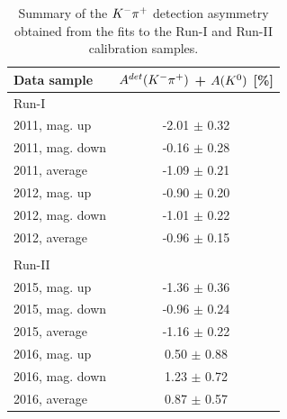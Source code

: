 \begin{table}[h]
\centering
 \begin{tabular}{l c}
 \hline
 \hline
Data sample & $A^{det}({{K}^-}{{\pi}^+})$ + $A({{K}^0})$ [\%] \\
\hline
Run-I & \\ 
2011, mag. up & -2.01 $\pm$ 0.32\\
2011, mag. down &  -0.16 $\pm$  0.28\\
2011, average & -1.09 $\pm$ 0.21\\

2012, mag. up &  -0.90 $\pm$ 0.20\\
2012, mag. down & -1.01 $\pm$ 0.22 \\
2012, average & -0.96 $\pm$ 0.15\\
\\
Run-II & \\ 
2015, mag. up & -1.36 $\pm$ 0.36 \\
2015, mag. down & -0.96 $\pm$ 0.24 \\
2015, average & -1.16 $\pm$ 0.22\\
2016, mag. up &  0.50 $\pm$ 0.88\\
2016, mag. down & 1.23 $\pm$ 0.72 \\
2016, average & 0.87 $\pm$ 0.57\\
\hline
\hline
\end{tabular}
\caption{Summary of the ${{K}^-}{{\pi}^+}$ detection asymmetry obtained from the fits to the Run-I and Run-II calibration samples.}
\label{table:KpiDetectionAsym}
\end{table}

